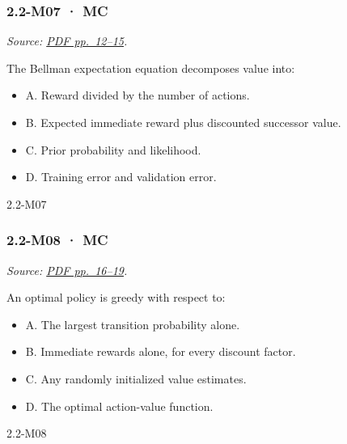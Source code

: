 \noindent\begin{minipage}{\linewidth}

\subsubsection{2.2-M07 · MC}\label{m07-mc-4}

\emph{Source:
\href{../Lecture\%20Slides/2.2.\%20Markov\%20decision\%20processes.pdf\#page=12}{PDF
pp.~12--15}.}

The Bellman expectation equation decomposes value into:

\begin{itemize}
\tightlist
\item
  A. Reward divided by the number of actions.
\item
  B. Expected immediate reward plus discounted successor value.
\item
  C. Prior probability and likelihood.
\item
  D. Training error and validation error.
\end{itemize}

\begin{solution}[8mm]{2.2-M07}

\end{solution}
\end{minipage}\par\medskip

\noindent\begin{minipage}{\linewidth}

\subsubsection{2.2-M08 · MC}\label{m08-mc-4}

\emph{Source:
\href{../Lecture\%20Slides/2.2.\%20Markov\%20decision\%20processes.pdf\#page=16}{PDF
pp.~16--19}.}

An optimal policy is greedy with respect to:

\begin{itemize}
\tightlist
\item
  A. The largest transition probability alone.
\item
  B. Immediate rewards alone, for every discount factor.
\item
  C. Any randomly initialized value estimates.
\item
  D. The optimal action-value function.
\end{itemize}

\begin{solution}[8mm]{2.2-M08}

\end{solution}
\end{minipage}\par\medskip

